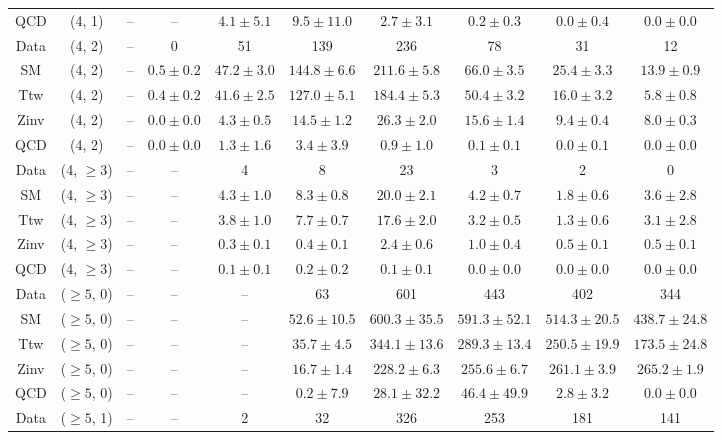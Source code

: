 \begin{table}[h!]
{\begin{tabular}{cccccccccc}
	QCD & (4, 1) & -- & -- & $4.1\pm 5.1$ & $9.5\pm 11.0$ & $2.7\pm 3.1$ & $0.2\pm 0.3$ & $0.0\pm 0.4$ & $0.0\pm 0.0$ \\[0.5ex] 
	Data & (4, 2) & -- & 0 & 51 & 139 & 236 & 78 & 31 & 12 \\[0.5ex] 
	SM & (4, 2) & -- & $0.5\pm 0.2$ & $47.2\pm 3.0$ & $144.8\pm 6.6$ & $211.6\pm 5.8$ & $66.0\pm 3.5$ & $25.4\pm 3.3$ & $13.9\pm 0.9$ \\[0.5ex] 
	Ttw & (4, 2) & -- & $0.4\pm 0.2$ & $41.6\pm 2.5$ & $127.0\pm 5.1$ & $184.4\pm 5.3$ & $50.4\pm 3.2$ & $16.0\pm 3.2$ & $5.8\pm 0.8$ \\[0.5ex] 
	Zinv & (4, 2) & -- & $0.0\pm 0.0$ & $4.3\pm 0.5$ & $14.5\pm 1.2$ & $26.3\pm 2.0$ & $15.6\pm 1.4$ & $9.4\pm 0.4$ & $8.0\pm 0.3$ \\[0.5ex] 
	QCD & (4, 2) & -- & $0.0\pm 0.0$ & $1.3\pm 1.6$ & $3.4\pm 3.9$ & $0.9\pm 1.0$ & $0.1\pm 0.1$ & $0.0\pm 0.1$ & $0.0\pm 0.0$ \\[0.5ex] 
	Data & (4, $\ge3$) & -- & -- & 4 & 8 & 23 & 3 & 2 & 0 \\[0.5ex] 
	SM & (4, $\ge3$) & -- & -- & $4.3\pm 1.0$ & $8.3\pm 0.8$ & $20.0\pm 2.1$ & $4.2\pm 0.7$ & $1.8\pm 0.6$ & $3.6\pm 2.8$ \\[0.5ex] 
	Ttw & (4, $\ge3$) & -- & -- & $3.8\pm 1.0$ & $7.7\pm 0.7$ & $17.6\pm 2.0$ & $3.2\pm 0.5$ & $1.3\pm 0.6$ & $3.1\pm 2.8$ \\[0.5ex] 
	Zinv & (4, $\ge3$) & -- & -- & $0.3\pm 0.1$ & $0.4\pm 0.1$ & $2.4\pm 0.6$ & $1.0\pm 0.4$ & $0.5\pm 0.1$ & $0.5\pm 0.1$ \\[0.5ex] 
	QCD & (4, $\ge3$) & -- & -- & $0.1\pm 0.1$ & $0.2\pm 0.2$ & $0.1\pm 0.1$ & $0.0\pm 0.0$ & $0.0\pm 0.0$ & $0.0\pm 0.0$ \\[0.5ex] 
	Data & ($\ge5$, 0) & -- & -- & -- & 63 & 601 & 443 & 402 & 344 \\[0.5ex] 
	SM & ($\ge5$, 0) & -- & -- & -- & $52.6\pm 10.5$ & $600.3\pm 35.5$ & $591.3\pm 52.1$ & $514.3\pm 20.5$ & $438.7\pm 24.8$ \\[0.5ex] 
	Ttw & ($\ge5$, 0) & -- & -- & -- & $35.7\pm 4.5$ & $344.1\pm 13.6$ & $289.3\pm 13.4$ & $250.5\pm 19.9$ & $173.5\pm 24.8$ \\[0.5ex] 
	Zinv & ($\ge5$, 0) & -- & -- & -- & $16.7\pm 1.4$ & $228.2\pm 6.3$ & $255.6\pm 6.7$ & $261.1\pm 3.9$ & $265.2\pm 1.9$ \\[0.5ex] 
	QCD & ($\ge5$, 0) & -- & -- & -- & $0.2\pm 7.9$ & $28.1\pm 32.2$ & $46.4\pm 49.9$ & $2.8\pm 3.2$ & $0.0\pm 0.0$ \\[0.5ex] 
	Data & ($\ge5$, 1) & -- & -- & 2 & 32 & 326 & 253 & 181 & 141 \\[0.5ex] 

\end{tabular}}
\end{table}
